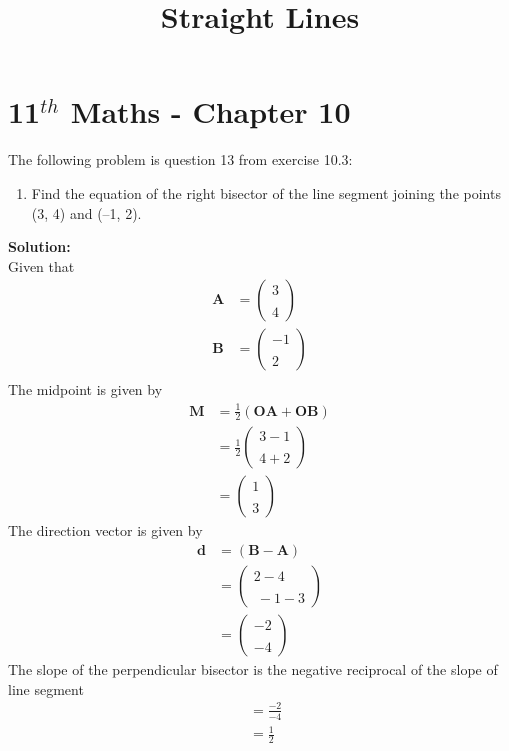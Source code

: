 \documentclass[12pt]{article}
\newcommand{\solution}{\noindent \textbf{Solution: }}
\newcommand{\myvec}[1]{\ensuremath{\begin{pmatrix}#1\end{pmatrix}}}
\let\vec\mathbf
\begin{document}
\graphicspath{{./Documents}{./figs}}
\begin{center}
	\title{\textbf{Straight Lines}}
	\date{\vspace{-5ex}}
	\maketitle
\end{center}
\setcounter{page}{1}
\section*{11$ ^{th} $ Maths - Chapter 10}
The following problem is question 13 from exercise 10.3:
\begin{enumerate}
	\item Find the equation of the right bisector of the
 line segment joining the points (3, 4) and (–1, 2).
\end{enumerate}
\solution \\
Given that
\begin{align}
   \vec{A} &= \myvec{3\\\\4}\\
   \vec{B} &= \myvec{-1\\\\2}\\
\end{align}
The midpoint is given by
\begin{align}
     \vec{M} &= \frac{1}{2}(\vec{OA} + \vec{OB})\\
   & = \frac{1}{2}\myvec{3 - 1\\\\4 + 2}\\
   & = \myvec{1\\\\3}
\end{align}
The direction vector is given by
\begin{align}
    \vec{d} &= (\vec{B} - \vec{A})\\
    & = \myvec{ 2 -4 \\\\\ -1 -3 }\\
    & = \myvec{-2 \\\\ -4}
\end{align}
The slope of the perpendicular bisector is the negative reciprocal of the slope of line segment
\begin{align}
    & = \frac{-2}{-4}\\
    & = \frac{1}{2}
\end{align}
\end{document}

